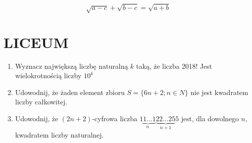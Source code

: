 \documentclass[10pt]{article}
\begin{document}
\[
\sqrt{a-c}+\sqrt{b-c}=\sqrt{a+b}
\]

\section*{LICEUM}
\begin{enumerate}
  \item Wyznacz największą liczbę naturalną \(k\) taką, że liczba 2018! Jest wielokrotnością liczby \(10^{k}\)
  \item Udowodnij, że żaden element zbioru \(S=\{6 n+2 ; n \in N\}\) nie jest kwadratem liczby całkowitej.
  \item Udowodnij, że \((2 n+2)\)-cyfrowa liczba \(\underbrace{11 \ldots 1}_{n} \underbrace{22 \ldots 25}_{n+1} 5\) jest, dla dowolnego \(n\), kwadratem liczby naturalnej.
\end{enumerate}
\end{document}
